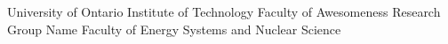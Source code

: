 
{} %
\examiner{} %
{} %
\author{Margarita \textsc{Tzivaki}} %
{} %

\subject{Typesetting} %
\keywords{} %
\university%
{University of Ontario Institute of Technology}
\department%
{Faculty of Awesomeness}
\group%
{Research Group Name}
\faculty
{Faculty of Energy Systems and Nuclear Science}

\AtBeginDocument{
\hypersetup{pdftitle=\ttitle} %
\hypersetup{pdfauthor=\authorname} %
\hypersetup{pdfkeywords=\keywordnames} %
}

\AtBeginDocument{
\hypersetup{pdftitle=\ttitle} %
\hypersetup{pdfauthor=\authorname} %
\hypersetup{pdfkeywords=\keywordnames} %
}
